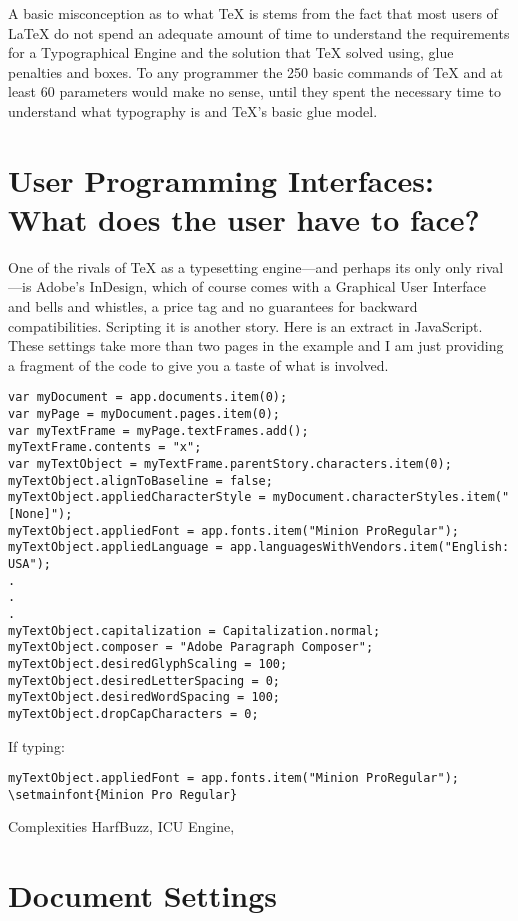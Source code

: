 \documentclass[pagestyleset=scrheadings]{scrbook}
\begin{document}
A basic misconception as to what TeX is stems from the fact that most users of LaTeX do not spend an adequate amount of time to understand the requirements for a Typographical Engine and the solution that TeX solved using, glue penalties and boxes. To any programmer the 250 basic commands of TeX and at least 60 parameters would make no sense, until they spent the necessary time to understand what typography is and TeX’s basic glue model.

\section{User Programming Interfaces: What does the user have to face?}

One of the rivals of TeX as a typesetting engine---and perhaps its only only rival---is Adobe’s InDesign, which of course comes with a Graphical User Interface and bells and whistles, a price tag and no guarantees for backward compatibilities. Scripting it is another story. Here is an extract in JavaScript. These settings take more than two pages in the example and I am just providing a fragment of the code to give you a taste of what is involved.

\begin{verbatim}
var myDocument = app.documents.item(0);
var myPage = myDocument.pages.item(0);
var myTextFrame = myPage.textFrames.add();
myTextFrame.contents = "x";
var myTextObject = myTextFrame.parentStory.characters.item(0);
myTextObject.alignToBaseline = false;
myTextObject.appliedCharacterStyle = myDocument.characterStyles.item("[None]");
myTextObject.appliedFont = app.fonts.item("Minion ProRegular");
myTextObject.appliedLanguage = app.languagesWithVendors.item("English: USA");
.
.
.
myTextObject.capitalization = Capitalization.normal;
myTextObject.composer = "Adobe Paragraph Composer";
myTextObject.desiredGlyphScaling = 100;
myTextObject.desiredLetterSpacing = 0;
myTextObject.desiredWordSpacing = 100;
myTextObject.dropCapCharacters = 0;
\end{verbatim}

If typing:

\begin{verbatim}
myTextObject.appliedFont = app.fonts.item("Minion ProRegular");
\setmainfont{Minion Pro Regular}
\end{verbatim}

Complexities HarfBuzz, ICU Engine, 

\section{Document Settings}
\end{document}
